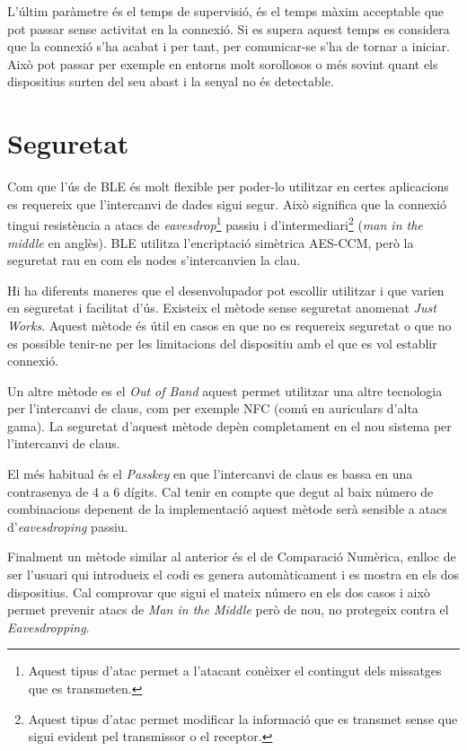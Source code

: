 L'últim paràmetre és el temps de supervisió, és el temps màxim acceptable que pot passar sense activitat en la connexió.
Si es supera aquest temps es considera que la connexió s'ha acabat i per tant, per comunicar-se s'ha de tornar a iniciar.
Això pot passar per exemple en entorns molt sorollosos o més sovint quant els dispositius surten del seu abast i la senyal no és detectable.

\section{Seguretat}
\label{sec:security}
Com que l'ús de BLE és molt flexible per poder-lo utilitzar en certes aplicacions es requereix que l'intercanvi de dades sigui segur.
Això significa que la connexió tingui resistència a atacs de \textit{eavesdrop}\footnote{Aquest tipus d'atac permet a l'atacant conèixer el contingut dels missatges que es transmeten.} passiu i d'intermediari\footnote{Aquest tipus d'atac permet modificar la informació que es transmet sense que sigui evident pel transmissor o el receptor.} (\textit{man in the middle} en anglès).
BLE utilitza l'encriptació simètrica AES-CCM, però la seguretat rau en com els nodes s'intercanvien la clau.

Hi ha diferents maneres que el desenvolupador pot escollir utilitzar i que varien en seguretat i facilitat d'ús.
Existeix el mètode sense seguretat anomenat \textit{Just Works}.
Aquest mètode és útil en casos en que no es requereix seguretat o que no es possible tenir-ne per les limitacions del dispositiu amb el que es vol establir connexió.

Un altre mètode es el \textit{Out of Band} aquest permet utilitzar una altre tecnologia per l'intercanvi de claus, com per exemple NFC (comú en auriculars d'alta gama).
La seguretat d'aquest mètode depèn completament en el nou sistema per l'intercanvi de claus.

El més habitual és el \textit{Passkey} en que l'intercanvi de claus es bassa en una contrasenya de 4 a 6 dígits.
Cal tenir en compte que degut al baix número de combinacions depenent de la implementació aquest mètode serà sensible a atacs d'\textit{eavesdroping} passiu.

Finalment un mètode similar al anterior és el de Comparació Numèrica, enlloc de ser l'usuari qui introdueix el codi es genera automàticament i es mostra en els dos dispositius.
Cal comprovar que sigui el mateix número en els dos casos i això permet prevenir atacs de \textit{Man in the Middle} però de nou, no protegeix contra el \textit{Eavesdropping}.

